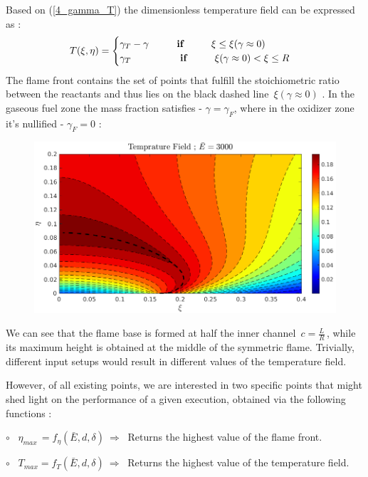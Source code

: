 \documentclass[12pt]{article}
\newcommand\tab[1][1cm]{\hspace*{#1}}
\numberwithin{equation}{section}
\begin{document}
\begin{flushleft}
Based on (\ref{4_gamma_T}) the dimensionless temperature field can be expressed as : 
\begin{align}
T(\xi, \eta) = \begin{cases}
\gamma_{T}-\gamma \tab \textbf{if} \tab \xi \leq \xi(\gamma \approx 0) \\
\gamma_{T} \hspace{17.5mm} \textbf{if} \tab \xi(\gamma \approx 0)<\xi \leq R \end{cases}
\end{align}
The flame front contains the set of points that fulfill the stoichiometric ratio between the reactants and thus lies on the black dashed line \,$\xi(\gamma \approx 0)$ . In the gaseous fuel zone the mass fraction satisfies - $\gamma = \gamma_{F}$, where in the oxidizer zone it's nullified - $\gamma_{F}=0$ : 
\begin{figure}[H]
\centering
\includegraphics[width=0.97\linewidth, center]{T_field.png}
\end{figure}
We can see that the flame base is formed at half the inner channel \,$c = \frac{L}{R}$\,, while its maximum height is obtained at the middle of the symmetric flame. Trivially, different input setups would result in different values of the temperature field. 

However, of all existing points, we are interested in two specific points  that might shed light on the performance of a given execution, obtained via the following functions : 

\tab $\circ$ \ $\eta_{max} \,= f_{\eta}(\bar{E}, d, \delta) \ \Rightarrow \ $ Returns the highest value of the flame front.

\tab $\circ$ \ $T_{max} = f_{T}(\bar{E}, d, \delta) \ \Rightarrow \ $ Returns the highest value of the temperature field.

\newpage


\end{flushleft}
\end{document}
